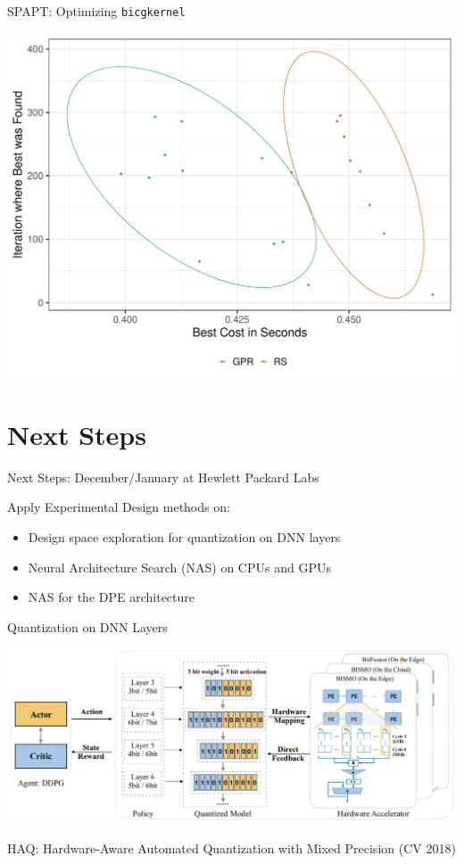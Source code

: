 \documentclass[10pt, compress, aspectratio=169, xcolor={table,usenames,dvipsnames}]{beamer}
\begin{document}
\begin{frame}[label={sec:orgc3c9b25},fragile]{SPAPT: Optimizing \texttt{bicgkernel}}
 \begin{center}
\begin{center}
\includegraphics[width=.7\columnwidth]{../../../img/updated_bicgkernel.pdf}
\end{center}
\end{center}
\end{frame}
\section{Next Steps}
\label{sec:org29139e5}
\begin{frame}[label={sec:org9a1a268}]{Next Steps: December/January at Hewlett Packard Labs}
\begin{block}{Apply Experimental Design methods on:}
\begin{itemize}
\item Design space exploration for \alert{quantization} on DNN layers
\item Neural Architecture Search (\alert{NAS}) on CPUs and GPUs
\item NAS for the \alert{DPE} architecture
\end{itemize}
\end{block}
\end{frame}
\begin{frame}[label={sec:orgda93fb4}]{Quantization on DNN Layers}
\begin{center}
\includegraphics[width=\columnwidth]{../../../img/haq_quantization.png}
\end{center}

\begin{center}
\scriptsize{HAQ: Hardware-Aware Automated Quantization with Mixed Precision (CV 2018)}
\end{center}
\end{frame}
\end{document}
